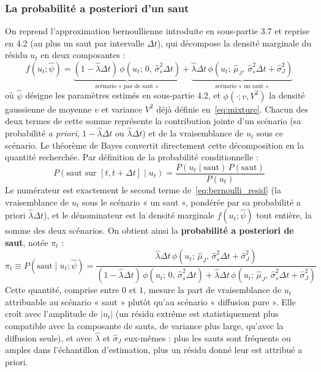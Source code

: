 \documentclass{article}
\begin{document}
\subsubsection*{La probabilité a posteriori d'un saut}
On reprend l'approximation bernoullienne introduite en sous-partie 3.7 et reprise en 4.2 (au plus un saut par intervalle $\Delta t$), qui décompose la densité marginale du résidu $u_t$ en deux composantes :
\begin{equation}
f(u_t;\hat{\psi}) = \underbrace{(1-\hat\lambda\Delta t)\,\phi\!\left(u_t;\,0,\,\hat\sigma_s^2\Delta t\right)}_{\text{scénario « pas de saut »}} + \underbrace{\hat\lambda\Delta t\,\phi\!\left(u_t;\,\hat\mu_J,\,\hat\sigma_s^2\Delta t+\hat\sigma_J^2\right)}_{\text{scénario « un saut »}}
\label{eq:bernoulli_resid}
\end{equation}
où $\hat{\psi}$ désigne les paramètres estimés en sous-partie 4.2, et $\phi(\cdot;v,V^2)$ la densité gaussienne de moyenne $v$ et variance $V^2$ déjà définie en~\eqref{eq:mixture}. Chacun des deux termes de cette somme représente la contribution jointe d'un scénario (sa probabilité \emph{a priori}, $1-\hat\lambda\Delta t$ ou $\hat\lambda\Delta t$) et de la vraisemblance de $u_t$ sous ce scénario. 
Le théorème de Bayes convertit directement cette décomposition en la quantité recherchée. Par définition de la probabilité conditionnelle :
\begin{equation}
P(\text{saut sur } [t,t+\Delta t] \mid u_t) = \frac{P(u_t \mid \text{saut})\, P(\text{saut})}{P(u_t)}
\end{equation}
Le numérateur est exactement le second terme de~\eqref{eq:bernoulli_resid} (la vraisemblance de $u_t$ sous le scénario « un saut », pondérée par sa probabilité a priori $\hat\lambda\Delta t$), et le dénominateur est la densité marginale $f(u_t;\hat{\psi})$ tout entière, la somme des deux scénarios. On obtient ainsi la \textbf{probabilité a posteriori de saut}, notée $\pi_t$ :
\begin{equation}
\pi_t \equiv P(\text{saut} \mid u_t;\hat\psi) = \frac{\hat\lambda\Delta t\,\phi\!\left(u_t;\,\hat\mu_J,\,\hat\sigma_s^2\Delta t+\hat\sigma_J^2\right)}{(1-\hat\lambda\Delta t)\,\phi\!\left(u_t;\,0,\,\hat\sigma_s^2\Delta t\right) + \hat\lambda\Delta t\,\phi\!\left(u_t;\,\hat\mu_J,\,\hat\sigma_s^2\Delta t+\hat\sigma_J^2\right)}
\label{eq:posterior_jump}
\end{equation}
Cette quantité, comprise entre $0$ et $1$, mesure la part de vraisemblance de $u_t$ attribuable au scénario « saut » plutôt qu'au scénario « diffusion pure ». Elle croît avec l'amplitude de $|u_t|$ (un résidu extrême est statistiquement plus compatible avec la composante de sauts, de variance plus large, qu'avec la diffusion seule), et avec $\hat\lambda$ et $\hat\sigma_J$ eux-mêmes : plus les sauts sont fréquents ou amples dans l'échantillon d'estimation, plus un résidu donné leur est attribué a priori.
\end{document}
